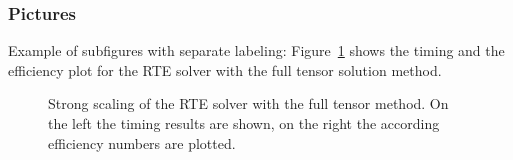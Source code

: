 \subsubsection{Pictures}
Example of subfigures with separate labeling:
Figure~\ref{fig:strongscalingfull} shows the timing  and the efficiency plot  for the RTE solver with the full tensor solution method.
\begin{figure}[h]
    \centering
    \caption{Strong scaling of the RTE solver with the full tensor method. On the left the timing results are shown, on the right the according efficiency numbers are plotted.}
    \label{fig:strongscalingfull}
\end{figure}

